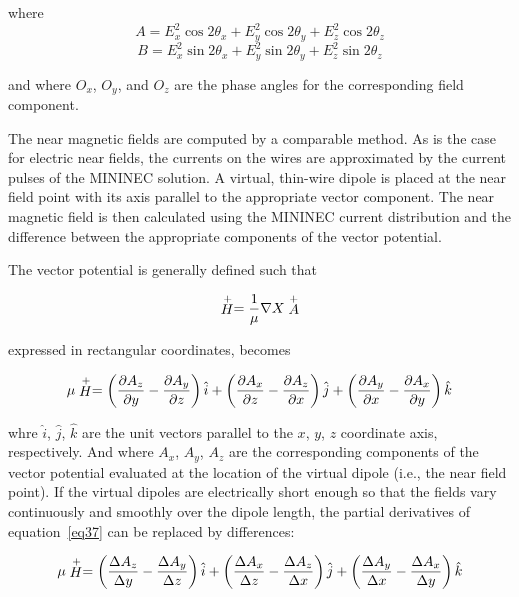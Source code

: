 \documentclass[12pt]{article}
\begin{document}
\noindent where
\[ A = E_x^2\cos 2\theta_x + E_y^2\cos 2\theta_y + E_z^2\cos 2\theta_z
\]
\[ B = E_x^2\sin 2\theta_x + E_y^2\sin 2\theta_y + E_z^2\sin 2\theta_z
\]

\noindent and where $O_x$, $O_y$, and $O_z$ are the phase angles for the
corresponding field component.

The near magnetic fields are computed by a comparable method. As is the
case for electric near fields, the currents on the wires are
approximated by the current pulses of the MININEC solution. A virtual,
thin-wire dipole is placed at the near field point with its axis
parallel to the appropriate vector component. The near magnetic field is
then calculated using the MININEC current distribution and the
difference between the appropriate components of the vector potential.

The vector potential is generally defined such that

\begin{equation}
\stackrel{+}{H} = \frac{1}{\mu}\nabla X\stackrel{+}{A}
\label{eq36}
\end{equation}

\noindent expressed in rectangular coordinates, becomes

\begin{equation}
\mu\stackrel{+}{H} =
\left(\frac{\partial A_z}{\partial y} - \frac{\partial A_y}{\partial z}\right)
\hat{i} +
\left(\frac{\partial A_x}{\partial z} - \frac{\partial A_z}{\partial x}\right)
\hat{j}+
\left(\frac{\partial A_y}{\partial x} - \frac{\partial A_x}{\partial y}\right)
\hat{k}
\label{eq37}
\end{equation}

whre $\hat{i}$, $\hat{j}$, $\hat{k}$ are the unit vectors parallel to
the $x$, $y$, $z$ coordinate axis, respectively. And where $A_x$, $A_y$,
$A_z$ are the corresponding components of the vector potential evaluated
at the location of the virtual dipole (i.e., the near field point). If
the virtual dipoles are electrically short enough so that the fields
vary continuously and smoothly over the dipole length, the partial
derivatives of equation~\eqref{eq37} can be replaced by differences:

\begin{equation}
\mu\stackrel{+}{H} =
\left(\frac{\Delta A_z}{\Delta y} - \frac{\Delta A_y}{\Delta z}\right)
\hat{i} +
\left(\frac{\Delta A_x}{\Delta z} - \frac{\Delta A_z}{\Delta x}\right)
\hat{j}+
\left(\frac{\Delta A_y}{\Delta x} - \frac{\Delta A_x}{\Delta y}\right)
\hat{k}
\label{eq38}
\end{equation}
\end{document}
